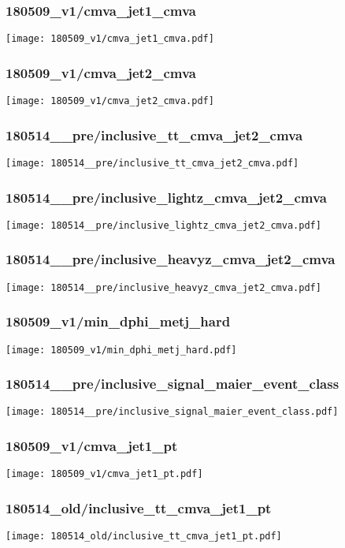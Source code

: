 \begin{frame}
   \frametitle{\small 180509\_v1/cmva\_jet1\_cmva}
   \centering
   \texttt{[image: 180509\_v1/cmva\_jet1\_cmva.pdf]}
\end{frame}

\begin{frame}
   \frametitle{\small 180509\_v1/cmva\_jet2\_cmva}
   \centering
   \texttt{[image: 180509\_v1/cmva\_jet2\_cmva.pdf]}
\end{frame}

\begin{frame}
   \frametitle{\small 180514\_\_pre/inclusive\_tt\_cmva\_jet2\_cmva}
   \centering
   \texttt{[image: 180514\_\_pre/inclusive\_tt\_cmva\_jet2\_cmva.pdf]}
\end{frame}

\begin{frame}
   \frametitle{\small 180514\_\_pre/inclusive\_lightz\_cmva\_jet2\_cmva}
   \centering
   \texttt{[image: 180514\_\_pre/inclusive\_lightz\_cmva\_jet2\_cmva.pdf]}
\end{frame}

\begin{frame}
   \frametitle{\small 180514\_\_pre/inclusive\_heavyz\_cmva\_jet2\_cmva}
   \centering
   \texttt{[image: 180514\_\_pre/inclusive\_heavyz\_cmva\_jet2\_cmva.pdf]}
\end{frame}

\begin{frame}
   \frametitle{\small 180509\_v1/min\_dphi\_metj\_hard}
   \centering
   \texttt{[image: 180509\_v1/min\_dphi\_metj\_hard.pdf]}
\end{frame}

\begin{frame}
   \frametitle{\small 180514\_\_pre/inclusive\_signal\_maier\_event\_class}
   \centering
   \texttt{[image: 180514\_\_pre/inclusive\_signal\_maier\_event\_class.pdf]}
\end{frame}

\begin{frame}
   \frametitle{\small 180509\_v1/cmva\_jet1\_pt}
   \centering
   \texttt{[image: 180509\_v1/cmva\_jet1\_pt.pdf]}
\end{frame}

\begin{frame}
   \frametitle{\small 180514\_old/inclusive\_tt\_cmva\_jet1\_pt}
   \centering
   \texttt{[image: 180514\_old/inclusive\_tt\_cmva\_jet1\_pt.pdf]}
\end{frame}

